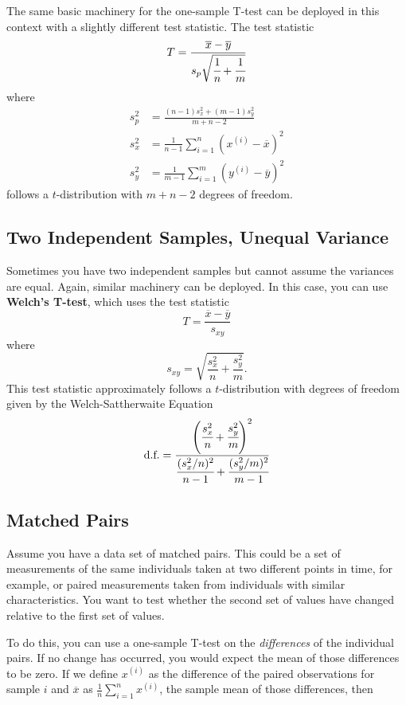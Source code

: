 The same basic machinery for the one-sample T-test can be deployed in this context with a slightly different test statistic. The test statistic
$$ T = \frac{\overline{x} - \overline{y}}{s_p \sqrt{\cfrac{1}{n} + \cfrac{1}{m}}} $$
where
\begin{align*} s_p^2 &= \frac{(n-1) s_x^2 + (m-1) s_y^2}{m + n - 2} \\
s_x^2 &= \frac{1}{n-1} \sum_{i=1}^n (x^{(i)} - \overline{x})^2 \\
s_y^2 &= \frac{1}{m-1} \sum_{i=1}^m (y^{(i)} - \overline{y})^2 \end{align*}
follows a $t$-distribution with $m + n - 2$ degrees of freedom.

\subsection{Two Independent Samples, Unequal Variance}

Sometimes you have two independent samples but cannot assume the variances are equal. Again, similar machinery can be deployed. In this case, you can use \textbf{Welch's T-test}, which uses the test statistic
$$ T = \frac{\overline{x} - \overline{y}}{s_{xy}} $$
where 
$$ s_{xy} = \sqrt{\frac{s_x^2}{n} + \frac{s_y^2}{m}}. $$
This test statistic approximately follows a $t$-distribution with degrees of freedom given by the {Welch-Sattherwaite Equation}
$$ \text{d.f.} = \frac{\left(\cfrac{s_x^2}{n} + \cfrac{s_y^2}{m} \right)^2}{\cfrac{(s_x^2/n)^2}{n-1} + \cfrac{(s_y^2/m)^2}{m-1}} $$ 

\subsection{Matched Pairs}

Assume you have a data set of matched pairs. This could be a set of measurements of the same individuals taken at two different points in time, for example, or paired measurements taken from individuals with similar characteristics. You want to test whether the second set of values have changed relative to the first set of values.

To do this, you can use a one-sample T-test on the \emph{differences} of the individual pairs. If no change has occurred, you would expect the mean of those differences to be zero. If we define $x^{(i)}$ as the difference of the paired observations for sample $i$ and $\overline{x}$ as $\frac{1}{n}\sum_{i=1}^n x^{(i)}$, the sample mean of those differences, then

